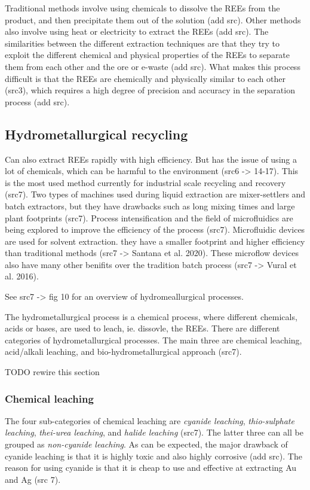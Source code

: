 Traditional methods involve using chemicals to dissolve the REEs from the product, and then precipitate them out of the solution (add src). Other methods also involve using heat or electricity to extract the REEs (add src). The similarities between the different extraction techniques are that they try to exploit the different chemical and physical properties of the REEs to separate them from each other and the ore or e-waste (add src). What makes this process difficult is that the REEs are chemically and physically similar to each other (src3), which requires a high degree of precision and accuracy in the separation process (add src).

\subsection{Hydrometallurgical recycling}

Can also extract REEs rapidly with high efficiency. But has the issue of using a lot of chemicals, which can be harmful to the environment (src6 -> 14-17). This is the most used method currently for industrial scale recycling and recovery (src7). Two types of machines used during liquid extraction are mixer-settlers and batch extractors, but they have drawbacks such as long mixing times and large plant footprints (src7). Process intensification and the field of microfluidics are being explored to improve the efficiency of the process (src7). Microfluidic devices are used for solvent extraction. they have a smaller footprint and higher efficiency than traditional methods (src7 -> Santana et al. 2020). These microflow devices also have many other benifits over the tradition batch process (src7 -> Vural et al. 2016).

See src7 -> fig 10 for an overview of hydromeallurgical processes.

The hydrometallurgical process is a chemical process, where different chemicals, acids or bases, are used to leach, ie. dissovle, the REEs. There are different categories of hydrometallurgical processes. The main three are chemical leaching, acid/alkali leaching, and bio-hydrometallurgical approach (src7). 

TODO rewire this section

\subsubsection{Chemical leaching}

The four sub-categories of chemical leaching are \textit{cyanide leaching}, \textit{thio-sulphate leaching}, \textit{thei-urea leaching}, and \textit{halide leaching} (src7). The latter three can all be grouped as \textit{non-cyanide leaching}. As can be expected, the major drawback of cyanide leaching is that it is highly toxic and also highly corrosive (add src). The reason for using cyanide is that it is cheap to use and effective at extracting Au and Ag (src 7).

